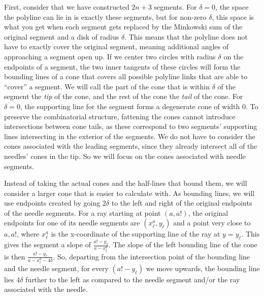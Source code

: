 \documentclass[]{llncs}
\begin{document}
First, consider that we have constructed $2n+3$ segments. For \(\delta = 0\), the space the polyline can lie in is exactly these segments, but for non-zero \(\delta\), this space is what you get when each segment gets replaced by the Minkowski sum of the original segment and a disk of radius \(\delta\). This means that the polyline does not have to exactly cover the original segment, meaning additional angles of approaching a segment open up. If we center two circles with radius \(\delta\) on the endpoints of a segment, the two inner tangents of these circles will form the bounding lines of a cone that covers all possible polyline links that are able to ``cover'' a segment. We will call the part of the cone that is within \(\delta\) of the segment the \emph{tip} of the cone, and the rest of the cone the \emph{tail} of the cone. For \(\delta = 0\), the supporting line for the segment forms a degenerate cone of width 0. To preserve the combinatorial structure, fattening the cones cannot introduce intersections between cone tails, as these correspond to two segments' supporting lines intersecting in the exterior of the segments.
 We do not have to consider the cones associated with the leading segments, since they already intersect all of the needles' cones in the tip. %
 So we will focus on the cones associated with needle segments.%


Instead of taking the actual cones and the half-lines that bound them, we will consider a larger cone that is easier to calculate with. As bounding lines, we will use endpoints created by going \(2\delta\) to the left and right of the original endpoints of the needle segments. For a ray starting at point \((a,a!)\), the original endpoints for one of its needle segments are \((x^a_\ell,y_\ell)\) and a point very close to \(a,a!\), where \(x^a_\ell\) is the x-coordinate of the supporting line of the ray at \(y=y_\ell\). This gives the segment a slope of \(\frac{a! - y_\ell}{a-x^a_\ell}\). The slope of the left bounding line of the cone is then \(\frac{a! - y_\ell}{a-x^a_\ell - 4\delta}\). So, departing from the intersection point of the bounding line and the needle segment, for every \((a!-y_\ell)\) we move upwards, the bounding line lies \(4\delta\) further to the left as compared to the needle segment and/or the ray associated with the needle. 
\end{document}
